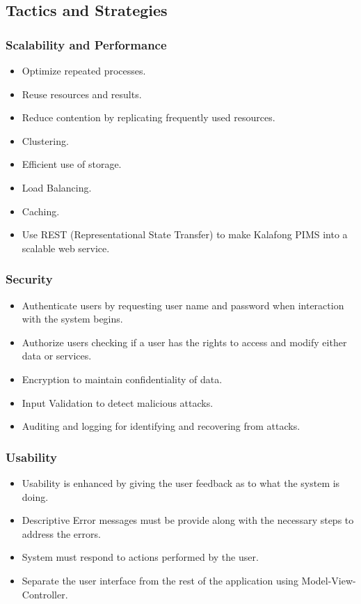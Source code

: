 \subsection{Tactics and Strategies}
\subsubsection{Scalability and Performance}
	\begin{itemize}
		\item Optimize repeated processes.
		\item Reuse resources and results.
		\item Reduce contention by replicating frequently used resources.
		\item Clustering.
		\item Efficient use of storage.
		\item Load Balancing.
		\item Caching.
		\item Use REST (Representational State Transfer) to make Kalafong PIMS into a scalable web service.
	\end{itemize}	
\subsubsection{Security}
	\begin{itemize}
		\item Authenticate users by requesting user name and password when interaction with the system begins.
		\item Authorize users checking if a user has the rights to access and modify either data or services.
		\item Encryption to maintain confidentiality of data.
		\item Input Validation to detect malicious attacks.
		\item Auditing and logging for identifying and recovering from attacks.
	\end{itemize}	
\subsubsection{Usability}
	\begin{itemize}
		\item Usability is enhanced by giving the user feedback as to what the system is doing.
		\item Descriptive Error messages must be provide along with the necessary steps to address the errors.
		\item System must respond to actions performed by the user.
		\item Separate the user interface from the rest of the application using Model-View-Controller.
	\end{itemize}
